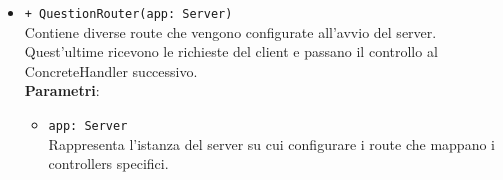 \begin{itemize}
\begin{itemize}
			\item \texttt{+ QuestionRouter(app: Server)}\\
			Contiene diverse route che vengono configurate all’avvio del server. Quest’ultime ricevono le richieste del client e passano il controllo al ConcreteHandler successivo.\\
			\textbf{Parametri}:
			\begin{itemize}
				\item \texttt{app: Server}\\
				Rappresenta l’istanza del server su cui configurare i route che mappano i controllers specifici.
			\end{itemize}
		\end{itemize}
	\end{itemize}